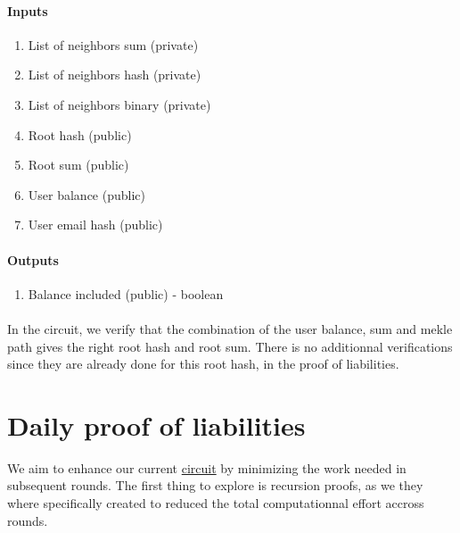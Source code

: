 \paragraph{Inputs}
\begin{enumerate}

    \item List of neighbors sum (private)
    
    \item List of neighbors hash (private)

    \item List of neighbors binary (private)

    \item Root hash (public)

    \item Root sum (public)

    \item User balance (public)

    \item User email hash (public)
    
    \end{enumerate}

\paragraph{Outputs}
\begin{enumerate}
    \item Balance included (public) - boolean
    \end{enumerate}

\paragraph{}
In the circuit, we verify that the combination of the user balance, sum and mekle path gives the right root hash and root sum. There is no additionnal
verifications since they are already done for this root hash, in the proof of liabilities.


\section{Daily proof of liabilities} 
We aim to enhance our current \hyperref[subsec:pl]{circuit} by minimizing the work needed in subsequent rounds.
The first thing to explore is recursion proofs, as we they where specifically created to reduced the total computationnal effort accross rounds.


